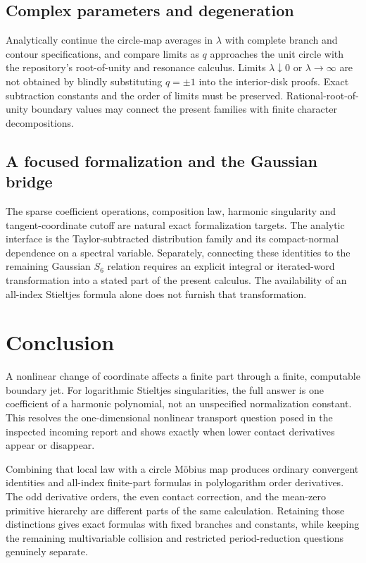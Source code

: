 \documentclass[11pt]{article}
\theoremstyle{definition}\newtheorem{definition}[theorem]{Definition}
\theoremstyle{remark}\newtheorem{remark}[theorem]{Remark}
\begin{document}
\subsection{Complex parameters and degeneration}
Analytically continue the circle-map averages in $\lambda$ with complete branch and contour specifications, and compare limits as $q$ approaches the unit circle with the repository's root-of-unity and resonance calculus. Limits $\lambda\downarrow0$ or $\lambda\to\infty$ are not obtained by blindly substituting $q=\pm1$ into the interior-disk proofs. Exact subtraction constants and the order of limits must be preserved. Rational-root-of-unity boundary values may connect the present families with finite character decompositions.

\subsection{A focused formalization and the Gaussian bridge}
The sparse coefficient operations, composition law, harmonic singularity and tangent-coordinate cutoff are natural exact formalization targets. The analytic interface is the Taylor-subtracted distribution family and its compact-normal dependence on a spectral variable. Separately, connecting these identities to the remaining Gaussian $S_6$ relation requires an explicit integral or iterated-word transformation into a stated part of the present calculus. The availability of an all-index Stieltjes formula alone does not furnish that transformation.

\section*{Conclusion}
A nonlinear change of coordinate affects a finite part through a finite, computable boundary jet. For logarithmic Stieltjes singularities, the full answer is one coefficient of a harmonic polynomial, not an unspecified normalization constant. This resolves the one-dimensional nonlinear transport question posed in the inspected incoming report and shows exactly when lower contact derivatives appear or disappear.

Combining that local law with a circle M\"obius map produces ordinary convergent identities and all-index finite-part formulas in polylogarithm order derivatives. The odd derivative orders, the even contact correction, and the mean-zero primitive hierarchy are different parts of the same calculation. Retaining those distinctions gives exact formulas with fixed branches and constants, while keeping the remaining multivariable collision and restricted period-reduction questions genuinely separate.
\end{document}
